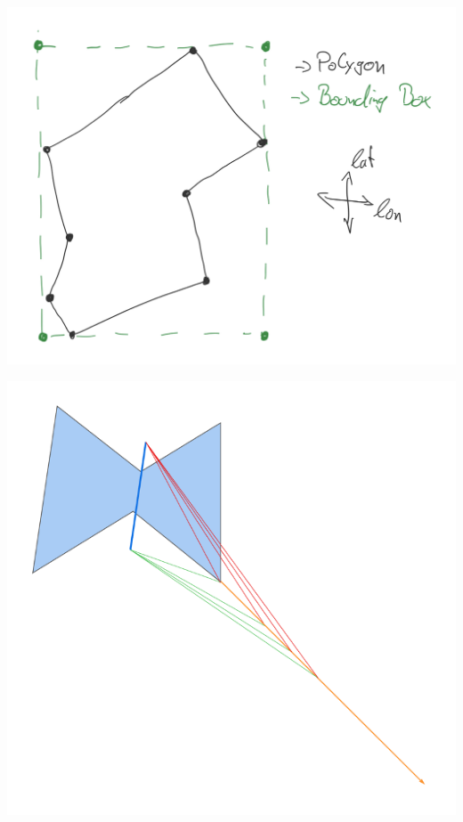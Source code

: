 \begin{center}
    \includegraphics[width=\columnwidth]{images/boundingbox}
    \label{fig:REPLACE}
\end{center}

\begin{center}
    \includegraphics[width=\columnwidth]{images/konkaves-problem}
    \label{fig:REPLACE}
\end{center}



